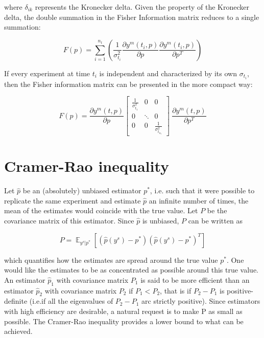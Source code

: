 \documentclass[]{scrartcl}
\begin{document}
where $\delta_{ik}$ represents the Kronecker delta. Given the property of the Kronecker delta, the double summation in the Fisher Information matrix reduces to a single summation:

\begin{equation}
	F(p) = \sum_{i=1}^{n_t} \left( \frac{1}{\sigma_{t_i}^2} \frac{\partial y^m(t_i, p)}{\partial p} \frac{\partial y^m(t_i, p)}{\partial p^T} \right)
\end{equation}

If every experiment at time $t_i$ is independent and characterized by its own $\sigma_{t_i}$, then the Fisher information matrix can be presented in the more compact way:

\begin{equation}
	F(p) = \frac{\partial y^m(t, p)}{\partial p} \begin{bmatrix}
		\frac{1}{\sigma_{t_1}^2} & 0 & 0\\
		0 & \ddots & 0 \\
		0 & 0 & \frac{1}{\sigma_{t_{n_t}}^2} 
	\end{bmatrix}\ \frac{\partial y^m(t, p)}{\partial p^T} 
\end{equation}

\section{Cramer-Rao inequality}

Let $\hat{p}$ be an (absolutely) unbiased estimator $p^*$, i.e. such that it were possible to replicate the same experiment and estimate $\hat{p}$ an infinite number of times, the mean of the estimates would coincide with the true value. Let $P$ be the covariance matrix of this estimator. Since $\hat{p}$ is unbiased, $P$ can be written as

\begin{equation}
	P = \mathop{\mathbb{E}}_{y^s|p^*} \left[ \left( \hat{p}(y^s) - p^* \right) \left( \hat{p}(y^s) - p^* \right)^T \right]
\end{equation}

which quantifies how the estimates are spread around the true value $p^*$. One would like the estimates to be as concentrated as possible around this true value. An estimator $\hat{p}_1$ with covariance matrix $P_1$ is said to be more efficient than an estimator $\hat{p}_2$ with covariance matrix $P_2$ if $P_1 < P_2$, that is if $P_2 - P_1$ is positive-definite (i.e.if all the eigenvalues of $P_2-P_1$ arc strictly positive). Since estimators with high efficiency are desirable, a natural request is to make P as small as possible. The Cramer-Rao inequality provides a lower bound to what can be achieved.
\end{document}
